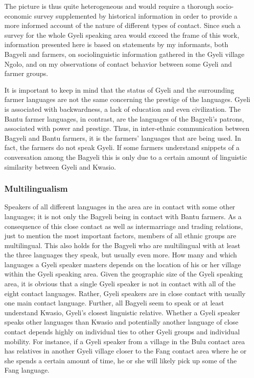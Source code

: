 The picture is thus quite heterogeneous and would require a thorough socio-economic survey supplemented by historical information in order to provide a more informed account of the nature of different types of contact. Since such a survey for the whole Gyeli speaking area would exceed the frame of this work, information presented here is based on statements by my informants, both Bagyeli and farmers, on sociolinguistic information gathered in the Gyeli village Ngolo, and on my observations of contact behavior between some Gyeli and farmer groups.

It is important to keep in mind that the status of Gyeli and the surrounding farmer languages are not the same concerning the prestige of the languages. Gyeli is associated with backwardness, a lack of education and even civilization. The Bantu farmer languages, in contrast, are the languages of the Bagyeli's patrons, associated with power and prestige. Thus, in inter-ethnic communication between Bagyeli and Bantu farmers, it is the farmers' languages that are being used. In fact, the farmers do not speak Gyeli. If some farmers understand snippets of a conversation among the Bagyeli this is only due to a certain amount of linguistic similarity between Gyeli and Kwasio.




\subsubsection{Multilingualism} 
Speakers of all different languages in the area are in contact with some other languages; it is not only the Bagyeli being in contact with Bantu farmers. As a consequence of this close contact as well as intermarriage and trading relations, just to mention the most important factors, members of all ethnic groups are multilingual. This also holds for the Bagyeli who are multilingual with at least the three languages they speak, but usually even more. How many and which languages a Gyeli speaker masters depends on the location of his or her village within the Gyeli speaking area. Given the geographic size of the Gyeli speaking area, it is obvious that a single Gyeli speaker is not in contact with all of the eight contact languages. Rather, Gyeli speakers are in close contact with usually one main contact language. Further, all Bagyeli seem to speak or at least understand Kwasio, Gyeli's closest linguistic relative. Whether a Gyeli speaker speaks other languages than Kwasio and potentially another language of close contact depends highly on individual ties to other Gyeli groups and individual mobility. For instance, if a Gyeli speaker from a village in the Bulu contact area has relatives in another Gyeli village closer to the Fang contact area where he or she spends a certain amount of time, he or she will likely pick up some of the Fang language.

